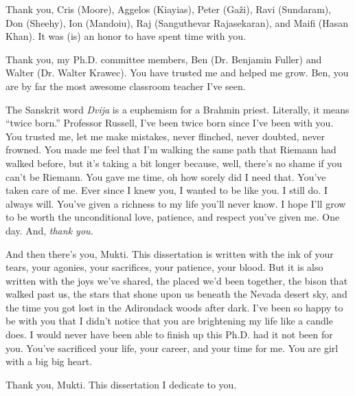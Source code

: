   Thank you, Cris (Moore), Aggelos (Kiayias), Peter (Ga\v{z}i), Ravi (Sundaram), Don (Sheehy), 
  Ion (Mandoiu), Raj (Sanguthevar Rajasekaran), and Maifi (Hasan Khan). 
  It was (is) an honor to have spent time with you.

  Thank you, my Ph.D. committee members, Ben (Dr. Benjamin Fuller) 
  and Walter (Dr. Walter Krawec). 
  You have trusted me and helped me grow. 
  Ben, you are by far the most awesome classroom teacher I've seen. 

  The Sanskrit word \emph{Dvija} is a euphemism for a Brahmin priest. 
  Literally, it means ``twice born.'' 
  Professor Russell, I've been twice born since I've been with you. 
  You trusted me, let me make mistakes, never flinched, never doubted, 
  never frowned. You made me feel that I'm walking the same path that Riemann had walked before, 
  but it's taking a bit longer because, well, there's no shame if you can't be Riemann. 
  You gave me time, oh how sorely did I need that. 
  You've taken care of me. 
  Ever since I knew you, I wanted to be like you. I still do. I always will. 
  You've given a richness to my life you'll never know.
  I hope I'll grow to be worth the unconditional love, patience, and respect you've given me. One day. 
  And, \emph{thank you.}

  And then there's you, Mukti. 
  This dissertation is written with the ink of your tears, 
  your agonies, your sacrifices, your patience, your blood. 
  But it is also written with the joys we've shared, 
  the placed we'd been together, 
  the bison that walked past us, 
  the stars that shone upon us beneath the Nevada desert sky, 
  and the time you got lost in the Adirondack woods after dark.
  I've been so happy to be with you 
  that I didn't notice that you are brightening my life 
  like a candle does. 
  I would never have been able to finish up this Ph.D. had it not been for you. 
  You've sacrificed your life, your career, and your time for me. 
  You are girl with a big big heart. 
  
  Thank you, Mukti. 
  This dissertation I dedicate to you.


